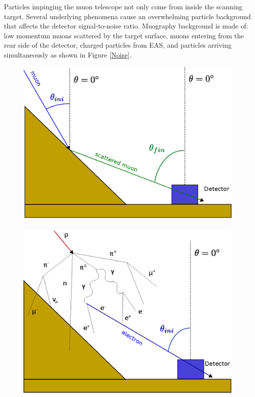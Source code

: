 \documentclass{PoS}
\begin{document}
Particles impinging the muon telescope not only come from inside the scanning target. Several underlying phenomena cause an overwhelming particle background that affects the detector signal-to-noise ratio. Muography background is made of: low momentum muons scattered by the target surface, muons entering from the rear side of the detector, charged particles from EAS, and particles arriving simultaneously as shown in Figure \ref{Noise}.

\begin{figure}[!h]
\centering
\includegraphics[scale=0.35]{Figures/Muon_scattering.eps} \ \ \
\includegraphics[scale=0.35]{Figures/EAS.eps}

\end{figure}
\end{document}
